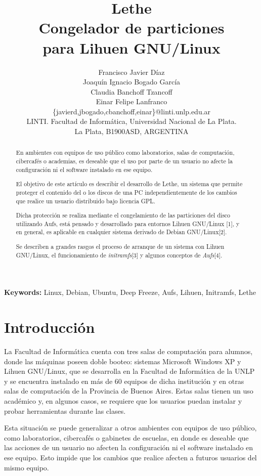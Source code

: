 \documentclass[final,narroweqnarray,inline,twoside]{ieee}
\author{Francisco Javier Díaz \\Joaquín Ignacio Bogado García \\
Claudia Banchoff Tzancoff\\Einar Felipe Lanfranco \\ \{javierd,jbogado,cbanchoff,einar\}@linti.unlp.edu.ar 
\\LINTI. Facultad de Informática, Universidad Nacional de La Plata.
\\La Plata, B1900ASD, ARGENTINA
}
\title{Lethe\\Congelador de particiones\\para Lihuen GNU/Linux}
\newcommand{\itref}[1]{[{#1}]}
\begin{document}
\maketitle
\sloppy

\begin{abstract}
En ambientes con equipos de uso público como laboratorios, salas de computación, cibercafés o academias, es deseable que el uso por parte de un usuario no afecte la configuración ni el software instalado en ese equipo. 

El objetivo de este artículo es describir el desarrollo de Lethe, un sistema que permite proteger el contenido del o los discos de una PC independientemente de los cambios que realice un usuario distribuido bajo licencia GPL.

Dicha protección se realiza mediante el congelamiento de las particiones del disco utilizando Aufs, está pensado y desarrollado para entornos Lihuen GNU/Linux \itref{1}, y en general, es aplicable en cualquier sistema derivado de Debian GNU/Linux\itref{2}.

Se describen a grandes rasgos el proceso de arranque de un sistema con Lihuen GNU/Linux, el funcionamiento de \textit{initramfs}\itref{3} y algunos conceptos de \textit{Aufs}\itref{4}.
\end{abstract}

\noindent \textbf{Keywords: }Linux, Debian, Ubuntu, Deep Freeze, Aufs, Lihuen, Initramfs, Lethe

\section{Introducción}
La Facultad de Informática cuenta con tres salas de computación para alumnos, donde las máquinas poseen doble booteo: sistemas Microsoft Windows XP y Lihuen GNU/Linux, que se desarrolla en la Facultad de Informática de la UNLP y se encuentra instalado en más de 60 equipos de dicha institución y en otras salas de computación de la Provincia de Buenos Aires. Estas salas tienen un uso académico y, en algunos casos, se requiere que los usuarios puedan instalar y probar herramientas durante las clases.

Esta situación se puede generalizar a otros ambientes con equipos de uso público, como laboratorios, cibercafés o gabinetes de escuelas, en donde es deseable que las acciones de un usuario no afecten la configuración ni el software instalado en ese equipo. Esto impide que los cambios que realice afecten a futuros usuarios del mismo equipo.
\end{document}

